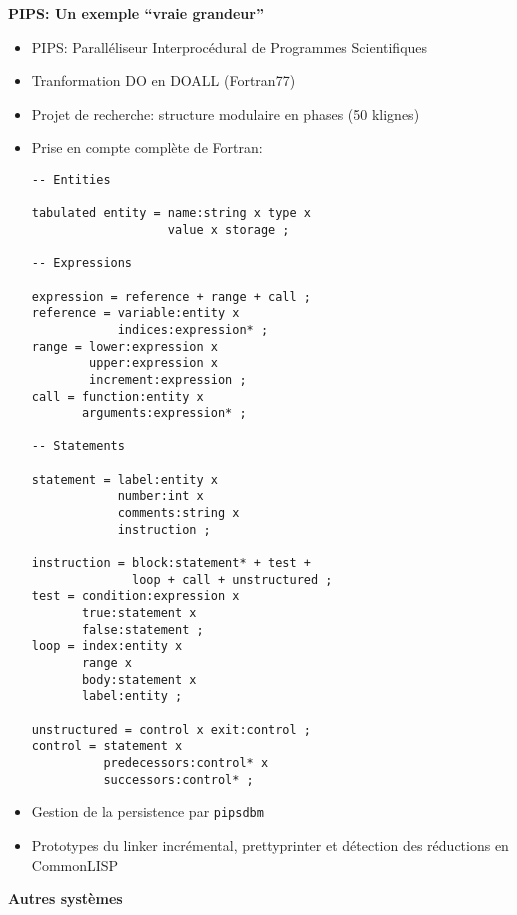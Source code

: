 \documentclass[11pt]{article}
\begin{document}
{\newpage

\begin{center}
{\huge\bf PIPS: Un exemple ``vraie grandeur''}
\end{center}

\vskip 2cm

\begin{itemize}
\item PIPS: Paralléliseur Interprocédural de Programmes Scientifiques
\item Tranformation DO en DOALL (Fortran77)
\item Projet de recherche: structure modulaire en phases (50 klignes)
\item Prise en compte complète de Fortran:

\begin{verbatim}
-- Entities

tabulated entity = name:string x type x 
                   value x storage ;

-- Expressions

expression = reference + range + call ;
reference = variable:entity x 
            indices:expression* ;
range = lower:expression x 
        upper:expression x 
        increment:expression ;
call = function:entity x 
       arguments:expression* ;

-- Statements

statement = label:entity x 
            number:int x 
            comments:string x 
            instruction ;

instruction = block:statement* + test + 
              loop + call + unstructured ;
test = condition:expression x 
       true:statement x 
       false:statement ;
loop = index:entity x 
       range x 
       body:statement x 
       label:entity ;

unstructured = control x exit:control ;
control = statement x 
          predecessors:control* x 
          successors:control* ;
\end{verbatim}
\item Gestion de la persistence par {\tt pipsdbm}
\item Prototypes du linker incrémental, prettyprinter et détection des 
réductions en CommonLISP
\end{itemize}

\newpage

\begin{center}
{\huge\bf Autres systèmes}
\end{center}

\vskip 2cm

}
\end{document}
